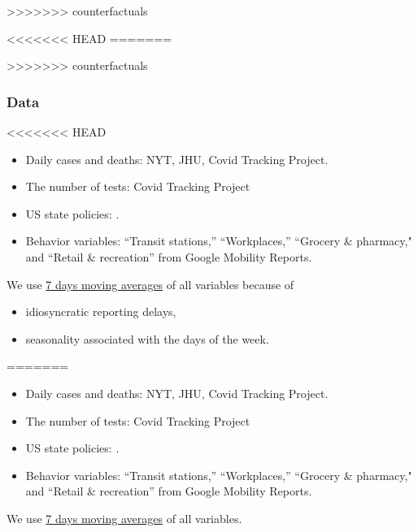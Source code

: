 \documentclass{beamer}
\def\bcolor{\color{green}}
\def\pcolor{\color{blue}}
\def\wcolor{\color{gray}}
\def\ycolor{\color{red}}
\begin{document}
\begin{frame}
\begin{frame}
>>>>>>> counterfactuals
\end{frame}


<<<<<<< HEAD
=======

>>>>>>> counterfactuals

\begin{frame}
  \frametitle{Data}\vspace{-0.05cm}
<<<<<<< HEAD
  
  \begin{itemize}
  \item {\ycolor Daily cases and deaths}: NYT, JHU, Covid Tracking Project.
  \item {\wcolor The number of tests}: Covid Tracking Project
  \item  {\pcolor US state policies}:
\cite{raifman2020}.
\item {\bcolor Behavior variables}:  ``Transit stations,''  ``Workplaces,''  ``Grocery \& pharmacy," and ``Retail \& recreation'' from Google Mobility Reports.  
  \end{itemize} 
  
We use  \underline{7 days moving averages} of all variables  because of
\begin{itemize}
\item  idiosyncratic reporting delays,
\item seasonality associated with the days of the week.
\end{itemize}
  
\end{frame}
 
=======

  \begin{itemize}
  \item {\ycolor Daily cases and deaths}: NYT, JHU, Covid Tracking Project.\smallskip
  \item {\wcolor The number of tests}: Covid Tracking Project\smallskip
  \item  {\pcolor US state policies}:
\cite{raifman2020}.\smallskip
\item {\bcolor Behavior variables}:  ``Transit stations,''  ``Workplaces,''  ``Grocery \& pharmacy," and ``Retail \& recreation'' from Google Mobility Reports.
  \end{itemize}

We use  \underline{7 days moving averages} of all variables. %

\end{frame}
\end{document}
